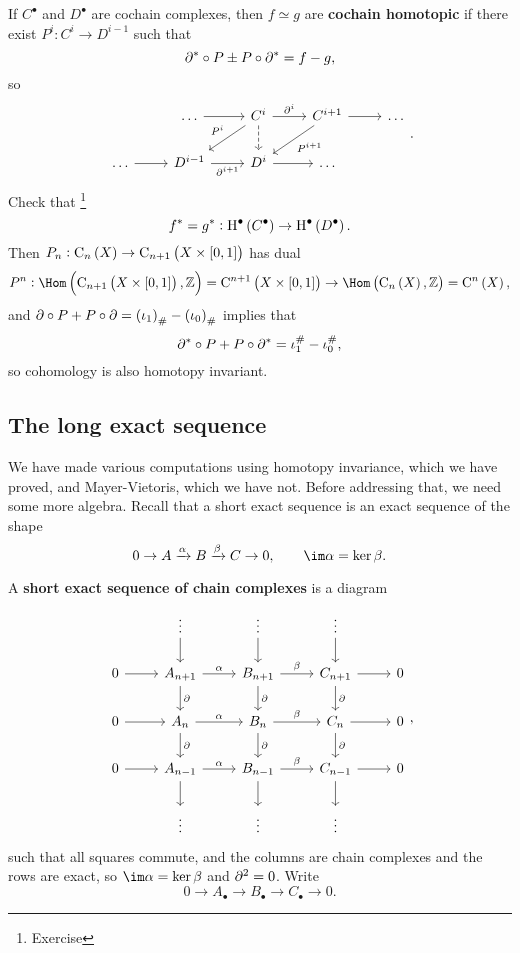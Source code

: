 \begin{remark*}
If $ C^\bullet $ and $ D^\bullet $ are cochain complexes, then $ f \simeq g $ are \textbf{cochain homotopic} if there exist $ P^i : C^i \to D^{i - 1} $ such that
$$ \partial^* \circ P \pm P \circ \partial^* = f - g, $$
so
$$
\begin{tikzcd}
& \dots \arrow{r} & C^i \arrow{r}{\da^i} \arrow{dl}[swap]{P^i} \arrow[dashed]{d} & C^{i + 1} \arrow{r} \arrow{dl}{P^{i + 1}} & \dots \\
\dots \arrow{r} & D^{i - 1} \arrow{r}[swap]{\da^{i + 1}} & D^i \arrow{r} & \dots &
\end{tikzcd}.
$$
Check that \footnote{Exercise}
$$ f^* = g^* : \H^\bullet\br{C^\bullet} \to \H^\bullet\br{D^\bullet}. $$
Then $ P_n : \C_n\br{X} \to \C_{n + 1}\br{X \times \sbr{0, 1}} $ has dual
$$ P^n : \Hom\br{\C_{n + 1}\br{X \times \sbr{0, 1}}, \ZZ} = \C^{n + 1}\br{X \times \sbr{0, 1}} \to \Hom\br{\C_n\br{X}, \ZZ} = \C^n\br{X}, $$
and $ \da \circ P + P \circ \da = \br{\iota_1}_\# - \br{\iota_0}_\# $ implies that
$$ \partial^* \circ P + P \circ \partial^* = \iota_1^\# - \iota_0^\#, $$
so cohomology is also homotopy invariant.
\end{remark*}

\pagebreak

\subsection{The long exact sequence}


We have made various computations using homotopy invariance, which we have proved, and Mayer-Vietoris, which we have not. Before addressing that, we need some more algebra. Recall that a short exact sequence is an exact sequence of the shape
$$ 0 \to A \xrightarrow{\alpha} B \xrightarrow{\beta} C \to 0, \qquad \im \alpha = \ker \beta. $$

\begin{definition*}
A \textbf{short exact sequence of chain complexes} is a diagram
$$
\begin{tikzcd}
& \vdots \arrow{d} & \vdots \arrow{d} & \vdots \arrow{d} & \\
0 \arrow{r} & A_{n + 1} \arrow{r}{\alpha} \arrow{d}{\da} & B_{n + 1} \arrow{r}{\beta} \arrow{d}{\da} & C_{n + 1} \arrow{r} \arrow{d}{\da} & 0 \\
0 \arrow{r} & A_n \arrow{r}{\alpha} \arrow{d}{\da} & B_n \arrow{r}{\beta} \arrow{d}{\da} & C_n \arrow{r} \arrow{d}{\da} & 0 \\
0 \arrow{r} & A_{n - 1} \arrow{r}{\alpha} \arrow{d} & B_{n - 1} \arrow{r}{\beta} \arrow{d} & C_{n - 1} \arrow{r} \arrow{d} & 0 \\
& \vdots & \vdots & \vdots &
\end{tikzcd},
$$
such that all squares commute, and the columns are chain complexes and the rows are exact, so $ \im \alpha = \ker \beta $ and $ \partial^2 = 0 $. Write
$$ 0 \to A_\bullet \to B_\bullet \to C_\bullet \to 0. $$
\end{definition*}

